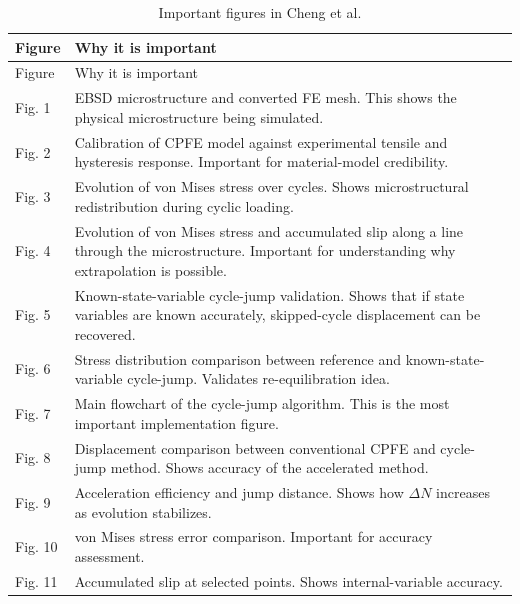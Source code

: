 \documentclass[11pt,a4paper]{article}
\begin{document}
\begin{longtable}{p{}p{}}
\caption{Important figures in Cheng et al.} \\
\toprule
Figure & Why it is important \\
\midrule
\endfirsthead
\toprule
Figure & Why it is important \\
\midrule
\endhead

Fig. 1 & EBSD microstructure and converted FE mesh. This shows the physical microstructure being simulated. \\

Fig. 2 & Calibration of CPFE model against experimental tensile and hysteresis response. Important for material-model credibility. \\

Fig. 3 & Evolution of von Mises stress over cycles. Shows microstructural redistribution during cyclic loading. \\

Fig. 4 & Evolution of von Mises stress and accumulated slip along a line through the microstructure. Important for understanding why extrapolation is possible. \\

Fig. 5 & Known-state-variable cycle-jump validation. Shows that if state variables are known accurately, skipped-cycle displacement can be recovered. \\

Fig. 6 & Stress distribution comparison between reference and known-state-variable cycle-jump. Validates re-equilibration idea. \\

Fig. 7 & Main flowchart of the cycle-jump algorithm. This is the most important implementation figure. \\

Fig. 8 & Displacement comparison between conventional CPFE and cycle-jump method. Shows accuracy of the accelerated method. \\

Fig. 9 & Acceleration efficiency and jump distance. Shows how $\Delta N$ increases as evolution stabilizes. \\

Fig. 10 & von Mises stress error comparison. Important for accuracy assessment. \\

Fig. 11 & Accumulated slip at selected points. Shows internal-variable accuracy. \\


\end{longtable}
\end{document}
